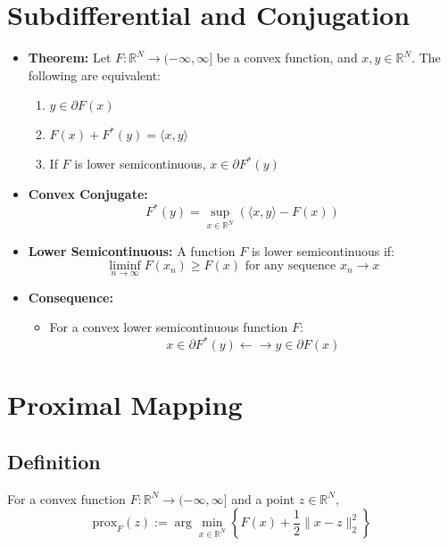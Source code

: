 \documentclass{article}
\begin{document}
\section*{Subdifferential and Conjugation}

\begin{itemize}
    \item \textbf{Theorem:} Let $F : \mathbb{R}^N \rightarrow (-\infty, \infty]$ be a convex function, and $x, y \in \mathbb{R}^N$. The following are equivalent:
    \begin{enumerate}[label=(\arabic*)]
        \item $y \in \partial F(x)$
        \item $F(x) + F^*(y) = \langle x, y \rangle$
        \item If $F$ is lower semicontinuous, $x \in \partial F^*(y)$
    \end{enumerate}
    
    \item \textbf{Convex Conjugate:}
    \[
    F^*(y) = \sup_{x \in \mathbb{R}^N} \left( \langle x, y \rangle - F(x) \right)
    \]
    
    \item \textbf{Lower Semicontinuous:} A function $F$ is lower semicontinuous if:
    \[
    \liminf_{n \to \infty} F(x_n) \geq F(x) \text{ for any sequence } x_n \to x
    \]
    
    \item \textbf{Consequence:}
    \begin{itemize}
        \item For a convex lower semicontinuous function $F$:
        \[
        x \in \partial F^*(y) \leftarrow \rightarrow y \in \partial F(x)
        \]
    \end{itemize}
\end{itemize}














\section*{Proximal Mapping}

\subsection*{Definition}
For a convex function $F : \mathbb{R}^N \rightarrow (-\infty,\infty]$ and a point $z \in \mathbb{R}^N$, 
\[
\text{prox}_F(z) := \arg \min_{x \in \mathbb{R}^N} \left\{ F(x) + \frac{1}{2} \| x - z \|_2^2 \right\}
\]
\end{document}
